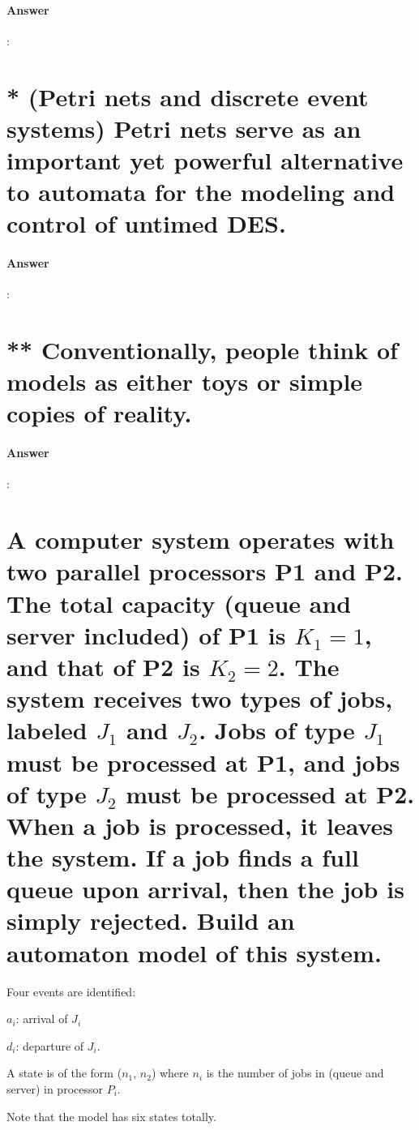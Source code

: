 \documentclass{article}
\begin{document}
\paragraph{Answer}:


\section{* (Petri nets and discrete event systems) Petri nets serve as an important yet powerful alternative to automata for the modeling and control of untimed DES.}

\paragraph{Answer}:


\section{** Conventionally, people think of models as either toys or simple copies of reality.}

\paragraph{Answer}:


\section{A computer system operates with two parallel processors P1 and P2. The total capacity (queue and server included) of P1 is $K_1 = 1$, and that of P2 is $K_2 = 2$. The system receives two types of jobs, labeled $J_1$ and $J_2$. Jobs of type $J_1$ must be processed at P1, and jobs of type $J_2$ must be processed at P2. When a job is processed, it leaves the system. If a job finds a full queue upon arrival, then the job is simply rejected. Build an automaton model of this system.}

\begin{tcolorbox}
  Four events are identified: 
  
  $a_i$: arrival of $J_i$ 

  $d_i$: departure of $J_i$.
  
  A state is of the form ($n_1$, $n_2$) where $n_i$ is the number of jobs in (queue and server) in processor $P_i$. 
  
  Note that the model has six states totally.
\end{tcolorbox}
\end{document}
